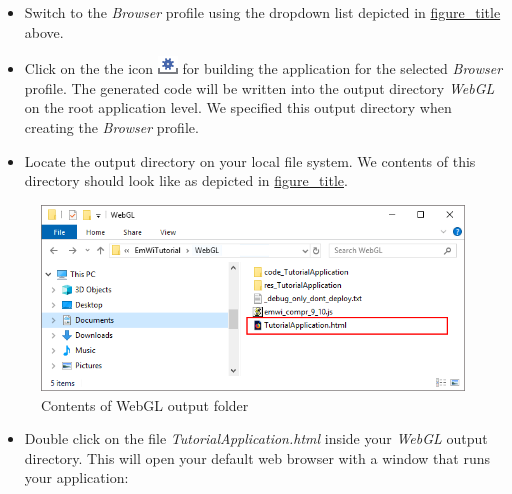 \documentclass[
  a4paper,
,tablecaptionabove
]{scrbook}
\begin{document}
\begin{itemize}
\item
  Switch to the \emph{Browser} profile using the dropdown list depicted
  in \protect\hyperlink{fig:DropdownList}{figure\_title} above.
\item
  Click on the the icon
  \includegraphics{./../asciidoc/modules/ROOT/assets/images/icons/BuildProfileIcon.png}
  for building the application for the selected \emph{Browser} profile.
  The generated code will be written into the output directory
  \emph{WebGL} on the root application level. We specified this output
  directory when creating the \emph{Browser} profile.
\item
  Locate the output directory on your local file system. We contents of
  this directory should look like as depicted in
  \protect\hyperlink{fig:WebGLFolder}{figure\_title}.
\end{itemize}

\begin{figure}
\centering
\includegraphics{./../asciidoc/modules/ROOT/assets/images/deviceintegration/OutputFolderWebGL.png}
\caption{Contents of WebGL output folder}
\end{figure}

\begin{itemize}
\item
  Double click on the file \emph{TutorialApplication.html} inside your
  \emph{WebGL} output directory. This will open your default web browser
  with a window that runs your application:
\end{itemize}
\end{document}
